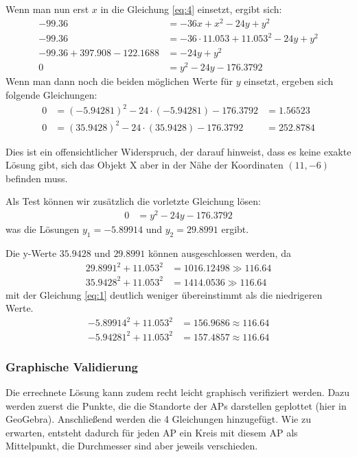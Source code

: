 Wenn man nun erst $x$ in die Gleichung \ref{eq:4} einsetzt, ergibt sich:
\begin{align*}
    -99.36                      & = -36x + x^2 - 24y + y^2                  \\
    -99.36                      & = -36 \cdot 11.053 + 11.053^2 - 24y + y^2 \\
    -99.36 + 397.908 - 122.1688 & =  - 24y + y^2                            \\
    0                           & = y^2 - 24y - 176.3792
\end{align*}
Wenn man dann noch die beiden möglichen Werte für $y$ einsetzt, ergeben sich folgende Gleichungen:
\begin{align*}
    0 & = (-5.94281)^2 - 24 \cdot (-5.94281) - 176.3792
      & = 1.56523                                                    \\
    0 & = (35.9428)^2 - 24 \cdot (35.9428) - 176.3792   & = 252.8784
\end{align*}

Dies ist ein offensichtlicher Widerspruch, der darauf hinweist, dass es keine exakte Lösung gibt, sich das Objekt X aber in der Nähe der Koordinaten $(11, -6)$ befinden muss.

Als Test können wir zusätzlich die vorletzte Gleichung lösen:
\begin{align*}
    0 & = y^2 - 24y - 176.3792
\end{align*}
was die Lösungen $y_1 = -5.89914$ und $y_2 = 29.8991$ ergibt.

Die y-Werte $35.9428$ und $29.8991$ können ausgeschlossen werden, da
\begin{align*}
    29.8991^2 + 11.053^2 & = 1016.12498 \gg 116.64 \\
    35.9428^2 + 11.053^2 & = 1414.0536 \gg 116.64
\end{align*}
mit der Gleichung \ref{eq:1} deutlich weniger übereinstimmt als die niedrigeren Werte.
\begin{align*}
    -5.89914^2 + 11.053^2 & = 156.9686 \approx 116.64 \\
    -5.94281^2 + 11.053^2 & = 157.4857 \approx 116.64
\end{align*}


\subsubsection*{Graphische Validierung}

Die errechnete Lösung kann zudem recht leicht graphisch verifiziert werden. Dazu werden zuerst die Punkte, die die Standorte der APs darstellen geplottet (hier in GeoGebra). Anschließend werden die 4 Gleichungen hinzugefügt. Wie zu erwarten, entsteht dadurch für jeden AP ein Kreis mit diesem AP als Mittelpunkt, die Durchmesser sind aber jeweils verschieden.

